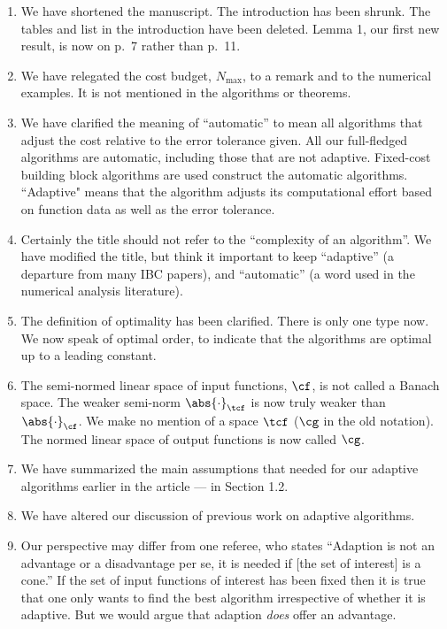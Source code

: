 \documentclass[11pt]{article}
\newcommand{\Fnorm}[1]{\abs{#1}_{\cf}}
\newcommand{\Ftnorm}[1]{\abs{#1}_{\tcf}}
\begin{document}
\begin{enumerate}
\renewcommand{\labelenumi}{\arabic{enumi}.}

\item We have shortened the manuscript.  The introduction has been shrunk. The tables and list in the introduction have been deleted.  Lemma 1, our first new result, is now on p.\ 7 rather than p.\ 11.  

\item We have relegated the cost budget, $N_{\max}$, to a remark and to the numerical examples.  It is not mentioned in the algorithms or theorems.

\item We have clarified the meaning of ``automatic'' to mean all algorithms that adjust the cost relative to the error tolerance given.  All our full-fledged algorithms are automatic, including those that are not adaptive.  Fixed-cost building block algorithms are used construct the automatic algorithms.  ``Adaptive" means that the algorithm adjusts its computational effort based on function data as well as the error tolerance.

\item Certainly the title should not refer to the ``complexity of an algorithm''.  We have modified the title, but think it important to keep ``adaptive'' (a departure from many IBC papers), and ``automatic'' (a word used in the numerical analysis literature).

\item The definition of optimality has been clarified.  There is only one type now.  We now speak of optimal order, to indicate that the algorithms are optimal up to a leading constant.

\item The semi-normed linear space of input functions, $\cf$, is not called a Banach space.  The weaker semi-norm $\Ftnorm{\cdot}$ is now truly weaker than $\Fnorm{\cdot}$.  We make no mention of a space $\tcf$ ($\cg$ in the old notation).  The normed linear space of output functions is now called $\cg$.

\item We have summarized the main assumptions that needed for our adaptive algorithms earlier in the article --- in Section 1.2.

\item We have altered our discussion of previous work on adaptive algorithms.

\item Our perspective may differ from one referee, who states ``Adaption is not an advantage or a disadvantage per se, it is needed if [the set of interest] is a cone.'' If the set of input functions of interest has been fixed then it is true that one only wants to find the best algorithm irrespective of whether it is adaptive.  But we would argue that adaption \emph{does} offer an advantage.


\end{enumerate}
\end{document}

